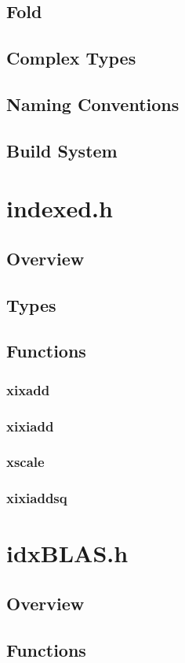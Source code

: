 \documentclass[12pt]{article}
\theoremstyle{plain}
\begin{document}
  \subsection{Fold}
  \subsection{Complex Types}
  \subsection{Naming Conventions}
  \subsection{Build System}
\section{indexed.h}
  \subsection{Overview}
  \subsection{Types}
  \subsection{Functions}
    \subsubsection{xixadd}
    \subsubsection{xixiadd}
    \subsubsection{xscale}
    \subsubsection{xixiaddsq}
\section{idxBLAS.h}
  \subsection{Overview}
  \subsection{Functions}
\end{document}

